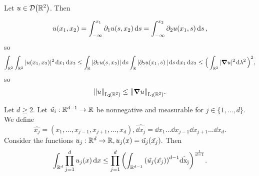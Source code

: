 \documentclass{article}
\begin{document}
\begin{example}
	Let $u \in \mathcal{D}\qty({\mathbb R}^2)$. Then 

	\begin{equation*}
		u\qty(x_1,x_2) = \int_{-\infty}^{x_1} \partial_{1}u\qty(s,x_2)\dd{s} = \int_{-\infty}^{x_2} \partial_{2}u(x_1,s)\dd{s},
	\end{equation*}
	so 
	\begin{equation*}
		\int_{{\mathbb R}^2}\int_{{\mathbb R}^2}|u(x_1,x_2)|^{2}\dd{x_1} \dd{x_2} \leq \int_{{\mathbb R}}|\partial_{1}u(s,x_2)|\dd{s} \int_{{\mathbb R}}|\partial_{2}u\qty(x_1,s)|\dd{s} \dd{x_1} \dd{x_2} \leq \Big(\int_{{\mathbb R}^2}|\grad u|^{2}\dd{\lambda^{2}}\Big)^{2},
	\end{equation*}
	so
	\[
		\norm{u}_{\LpSet[2]{\R^2}} \leq \norm{\grad u}_{\LpSet[1]{\R^2}}.
	\]
\end{example}

\begin{lemma}
	Let $d\geq 2$. Let $\hat{u_i}:{\mathbb R}^{d-1} \to {\mathbb R}$ be nonnegative and measurable for $j \in \{1,\dots,d\}.$ We define
	\[
	\hat{x_j} = (x_1, \dots, x_{j-1}, x_{j+1}, \dots, x_d), \hat{\dd{x_j}} = \dd{x_1} \dots \dd{x_{j-1}} \dd{x_{j+1}} \dots \dd{x_d}.
	\]
Consider the functions $u_j:{\mathbb R}^d \to {\mathbb R}, u_j\qty(x)=\hat{u_j}(\hat{x_j}).$ Then
	\begin{equation}
		\int_{{\mathbb R}^d}\prod_{j=1}^d u_j\qty(x)\dd{x} \leq \prod_{j=1}^d \qty(\int_{{\mathbb R}^{d-1}}\qty(\hat{u_j}\qty(\hat{x_j}))^{d-1}\hat{\dd{x_j}})^{\frac{1}{d-1}}.
	\end{equation}
\end{lemma}
\end{document}
